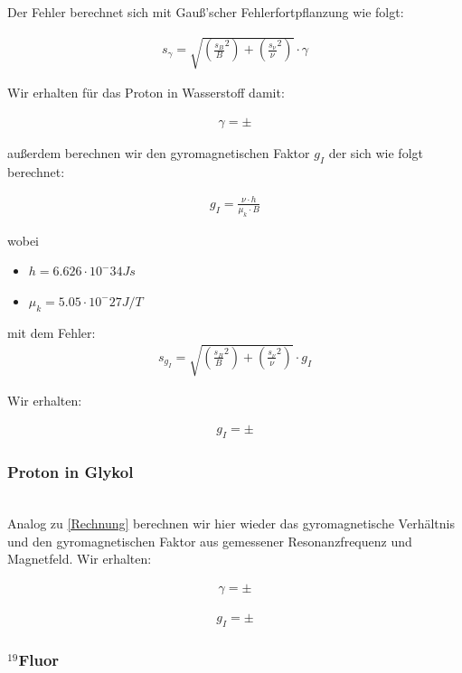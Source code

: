 \documentclass[12pt]{article}
\begin{document}
Der Fehler berechnet sich mit Gauß'scher Fehlerfortpflanzung wie folgt:

\begin{align*}
s_{\gamma} = \sqrt{\left(\frac{s_B}{B}^2\right)+\left(\frac{s_\nu}{\nu}^2 \right)}\cdot \gamma
\end{align*}

Wir erhalten für das Proton in Wasserstoff damit: 

\begin{align*}
\gamma =  \pm
\end{align*}

außerdem berechnen wir den gyromagnetischen Faktor $g_I$ der sich wie folgt berechnet: 

\begin{align*}
g_I = \frac{\nu \cdot h}{\mu_k \cdot B}
\end{align*}

wobei 
\begin{itemize}
	\item $h =  6.626 \cdot 10^-34 Js$
	\item $\mu_k = 5.05 \cdot 10^-27 J/T$
\end{itemize}

mit dem Fehler:
\begin{align*}
s_{g_I} = \sqrt{\left(\frac{s_B}{B}^2\right)+\left(\frac{s_\nu}{\nu}^2 \right)}\cdot g_I
\end{align*}

Wir erhalten:

\begin{align*}
g_I =   \pm
\end{align*}
\subsubsection{Proton in Glykol}
\ \\

Analog zu \ref{Rechnung} berechnen wir hier wieder das gyromagnetische Verhältnis und den gyromagnetischen Faktor aus gemessener Resonanzfrequenz und Magnetfeld. Wir erhalten:

\begin{align*}
\gamma =  \pm
\end{align*}

\begin{align*}
g_I =   \pm
\end{align*}

\subsubsection{$^{19}$Fluor} \label{MEINEXISTEINARSCH}
\ \\
\end{document}
